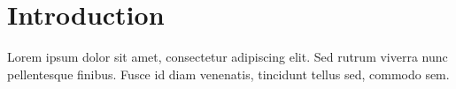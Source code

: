 \section{Introduction} %
Lorem ipsum dolor sit amet, consectetur adipiscing elit. Sed rutrum viverra nunc pellentesque finibus. Fusce id diam venenatis, tincidunt tellus sed, commodo sem.
